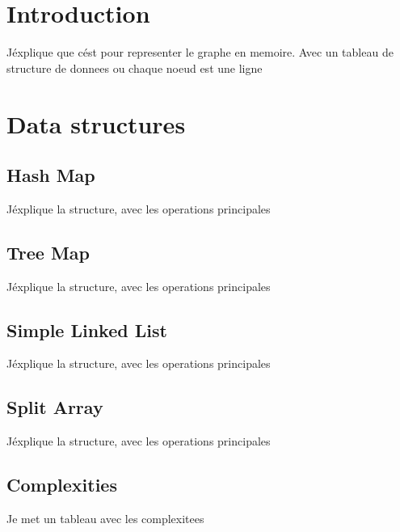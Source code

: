 \section{Introduction}
J\' explique que c\' est pour representer le graphe en memoire. Avec un tableau de structure de donnees ou chaque noeud est une ligne
\section{Data structures}
\subsection{Hash Map}
J\' explique la structure, avec les operations principales
\subsection{Tree Map}
J\' explique la structure, avec les operations principales
\subsection{Simple Linked List}
J\' explique la structure, avec les operations principales
\subsection{Split Array}
J\' explique la structure, avec les operations principales
\subsection{Complexities}
Je met un tableau avec les complexitees